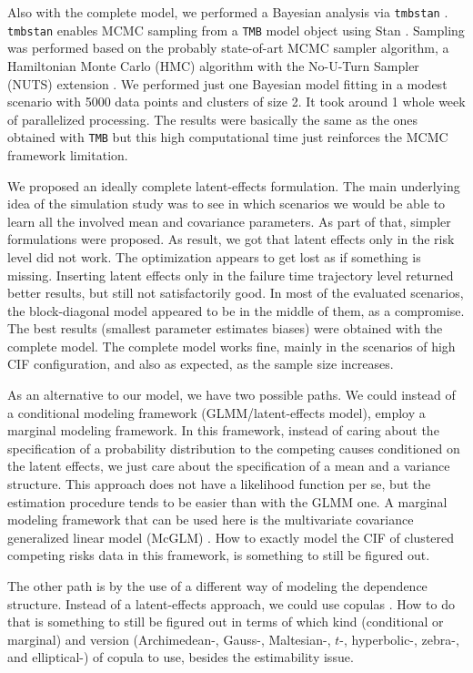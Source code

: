 \documentclass[a4paper,12pt]{article}
\begin{document}
Also with the complete model, we performed a Bayesian analysis via
\texttt{tmbstan} \citep{tmbstan}. \texttt{tmbstan} enables MCMC sampling
\citep{MCMC, Diaconis} from a \texttt{TMB} model object using Stan
\citep{Stan, RStan}. Sampling was performed based on the probably
state-of-art MCMC sampler algorithm, a Hamiltonian Monte Carlo (HMC)
algorithm with the No-U-Turn Sampler (NUTS) extension
\citep{NUTS-HMC}. We performed just one Bayesian model fitting in a
modest scenario with 5000 data points and clusters of size 2. It took
around 1 whole week of parallelized processing. The results were
basically the same as the ones obtained with \texttt{TMB} but this high
computational time just reinforces the MCMC framework limitation.

We proposed an ideally complete latent-effects formulation. The main
underlying idea of the simulation study was to see in which scenarios we
would be able to learn all the involved mean and covariance
parameters. As part of that, simpler formulations were proposed. As
result, we got that latent effects only in the risk level did not
work. The optimization appears to get lost as if something is
missing. Inserting latent effects only in the failure time trajectory
level returned better results, but still not satisfactorily good. In
most of the evaluated scenarios, the block-diagonal model appeared to be
in the middle of them, as a compromise. The best results (smallest
parameter estimates biases) were obtained with the complete model. The
complete model works fine, mainly in the scenarios of high CIF
configuration, and also as expected, as the sample size increases.

As an alternative to our model, we have two possible paths. We could
instead of a conditional modeling framework (GLMM/latent-effects model),
employ a marginal modeling framework. In this framework, instead of
caring about the specification of a probability distribution to the
competing causes conditioned on the latent effects, we just care about
the specification of a mean and a variance structure. This approach does
not have a likelihood function per se, but the estimation procedure
tends to be easier than with the GLMM one. A marginal modeling framework
that can be used here is the multivariate covariance generalized linear
model (McGLM) \citep{mcglm, rmcglm}. How to exactly model the CIF of
clustered competing risks data in this framework, is something to still
be figured out.

The other path is by the use of a different way of modeling the
dependence structure. Instead of a latent-effects approach, we could use
copulas \citep{copulas,semiparametricSCHEIKE,gcmr,factorcopulas}. How to
do that is something to still be figured out  in terms of which kind
(conditional or marginal) and version (Archimedean-, Gauss-, Maltesian-,
\(t\)-, hyperbolic-, zebra-, and elliptical-) of copula to use, besides
the estimability issue.
\end{document}

